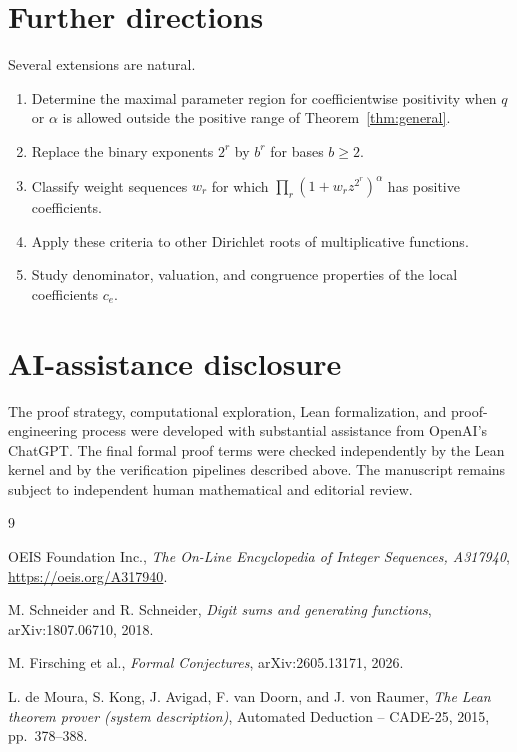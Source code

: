 \documentclass[11pt]{article}
\theoremstyle{definition}
\theoremstyle{remark}
\begin{document}
\section{Further directions}

Several extensions are natural.

\begin{enumerate}[label=(\roman*)]
  \item Determine the maximal parameter region for coefficientwise positivity when $q$ or $\alpha$ is allowed outside the positive range of Theorem~\ref{thm:general}.
  \item Replace the binary exponents $2^r$ by $b^r$ for bases $b\ge2$.
  \item Classify weight sequences $w_r$ for which
  $\prod_r(1+w_rz^{2^r})^\alpha$ has positive coefficients.
  \item Apply these criteria to other Dirichlet roots of multiplicative functions.
  \item Study denominator, valuation, and congruence properties of the local coefficients $c_e$.
\end{enumerate}

\section*{AI-assistance disclosure}

The proof strategy, computational exploration, Lean formalization, and proof-engineering process were developed with substantial assistance from OpenAI's ChatGPT.  The final formal proof terms were checked independently by the Lean kernel and by the verification pipelines described above.  The manuscript remains subject to independent human mathematical and editorial review.

\begin{thebibliography}{9}

OEIS Foundation Inc.,
\emph{The On-Line Encyclopedia of Integer Sequences, A317940},
\url{https://oeis.org/A317940}.

M. Schneider and R. Schneider,
\emph{Digit sums and generating functions},
arXiv:1807.06710, 2018.

M. Firsching et al.,
\emph{Formal Conjectures},
arXiv:2605.13171, 2026.

L. de Moura, S. Kong, J. Avigad, F. van Doorn, and J. von Raumer,
\emph{The Lean theorem prover (system description)},
Automated Deduction -- CADE-25, 2015, pp.~378--388.

\end{thebibliography}
\end{document}

